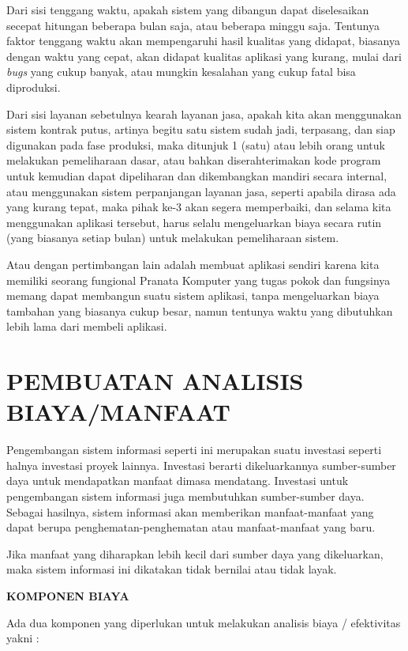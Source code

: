 \documentclass[pdftex,12pt, oneside]{article}
\begin{document}
Dari sisi tenggang waktu, apakah sistem yang dibangun dapat diselesaikan secepat hitungan beberapa bulan saja, atau beberapa minggu saja. Tentunya faktor tenggang waktu akan mempengaruhi hasil kualitas yang didapat, biasanya dengan waktu yang cepat, akan didapat kualitas aplikasi yang kurang, mulai dari \textit{bugs} yang cukup banyak, atau mungkin kesalahan yang cukup fatal bisa diproduksi.

Dari sisi layanan sebetulnya kearah layanan jasa, apakah kita akan menggunakan sistem kontrak putus, artinya begitu satu sistem sudah jadi, terpasang, dan siap digunakan pada fase produksi, maka ditunjuk 1 (satu) atau lebih orang untuk melakukan pemeliharaan dasar, atau bahkan diserahterimakan kode program untuk kemudian dapat dipeliharan dan dikembangkan mandiri secara internal, atau menggunakan sistem perpanjangan layanan jasa, seperti apabila dirasa ada yang kurang tepat, maka pihak ke-3 akan segera memperbaiki, dan selama kita menggunakan aplikasi tersebut, harus selalu mengeluarkan biaya secara rutin (yang biasanya setiap bulan) untuk melakukan pemeliharaan sistem.

Atau dengan pertimbangan lain adalah membuat aplikasi sendiri karena kita memiliki seorang fungional Pranata Komputer yang tugas pokok dan fungsinya memang dapat membangun suatu sistem aplikasi, tanpa mengeluarkan biaya tambahan yang biasanya cukup besar, namun tentunya waktu yang dibutuhkan lebih lama dari membeli aplikasi.

\section{PEMBUATAN ANALISIS BIAYA/MANFAAT}

Pengembangan sistem informasi seperti ini merupakan suatu investasi seperti halnya investasi proyek lainnya. Investasi berarti dikeluarkannya sumber-sumber daya untuk mendapatkan manfaat dimasa mendatang. Investasi untuk pengembangan sistem informasi juga membutuhkan sumber-sumber daya. Sebagai hasilnya, sistem informasi akan memberikan manfaat-manfaat yang dapat berupa penghematan-penghematan atau manfaat-manfaat yang baru.

Jika manfaat yang diharapkan lebih kecil dari sumber daya yang dikeluarkan, maka sistem informasi ini dikatakan tidak bernilai atau tidak layak.

\textbf{KOMPONEN BIAYA}

Ada dua komponen yang diperlukan untuk melakukan analisis biaya / efektivitas yakni :
\end{document}
